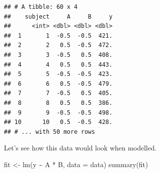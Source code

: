 \documentclass[
]{book}
\newenvironment{Shaded}{\begin{snugshade}}{\end{snugshade}}
\newcommand{\AttributeTok}[1]{\textcolor[rgb]{0.77,0.63,0.00}{#1}}
\newcommand{\CommentTok}[1]{\textcolor[rgb]{0.56,0.35,0.01}{\textit{#1}}}
\newcommand{\DecValTok}[1]{\textcolor[rgb]{0.00,0.00,0.81}{#1}}
\newcommand{\FunctionTok}[1]{\textcolor[rgb]{0.00,0.00,0.00}{#1}}
\newcommand{\NormalTok}[1]{#1}
\newcommand{\OtherTok}[1]{\textcolor[rgb]{0.56,0.35,0.01}{#1}}
\newcommand{\SpecialCharTok}[1]{\textcolor[rgb]{0.00,0.00,0.00}{#1}}
\begin{document}
\begin{Shaded}
\end{Shaded}

\begin{verbatim}
## # A tibble: 60 x 4
##    subject     A     B     y
##      <int> <dbl> <dbl> <dbl>
##  1       1  -0.5  -0.5  421.
##  2       2   0.5  -0.5  472.
##  3       3  -0.5   0.5  408.
##  4       4   0.5   0.5  443.
##  5       5  -0.5  -0.5  423.
##  6       6   0.5  -0.5  479.
##  7       7  -0.5   0.5  405.
##  8       8   0.5   0.5  386.
##  9       9  -0.5  -0.5  498.
## 10      10   0.5  -0.5  428.
## # ... with 50 more rows
\end{verbatim}

Let's see how this data would look when modelled.

\begin{Shaded}
\begin{Highlighting}[]
\NormalTok{fit }\OtherTok{\textless{}{-}} \FunctionTok{lm}\NormalTok{(y }\SpecialCharTok{\textasciitilde{}}\NormalTok{ A }\SpecialCharTok{*}\NormalTok{ B, }\AttributeTok{data =}\NormalTok{ data)}
\FunctionTok{summary}\NormalTok{(fit)}
\end{Highlighting}
\end{Shaded}
\end{document}
